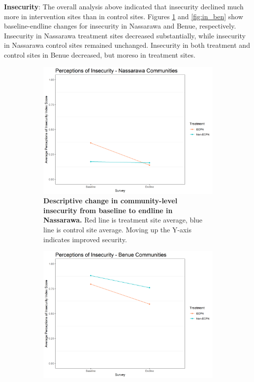 \documentclass[11pt]{article}
\begin{document}
\textbf{Insecurity}: The overall analysis above indicated that
insecurity declined much more in intervention sites than in control
sites. Figures \ref{fig:in_nas} and \ref{fig:in_ben} show
baseline-endline changes for insecurity in Nassarawa and Benue,
respectively. Insecurity in Nassarawa treatment sites decreased
substantially, while insecurity in Nassarawa control sites remained
unchanged. Insecurity in both treatment and control sites in Benue
decreased, but moreso in treatment sites.

\begin{figure}[H]
    \begin{subfigure}[b]{.48\textwidth}
    \centering
        \includegraphics[width=\linewidth]{../../../figs/inComm_plot_nas.png}
        \caption{\textbf{Descriptive change in community-level insecurity from baseline to endline in Nassarawa.} Red line is treatment site average, blue line is control site average.  Moving up the Y-axis indicates improved security.}
        \label{fig:in_nas}
    \end{subfigure}
    \hfill
    \begin{subfigure}[b]{.48\textwidth}
    \centering
        \includegraphics[width=\linewidth]{../../../figs/inComm_plot_ben.png}

\end{subfigure}
\end{figure}
\end{document}
